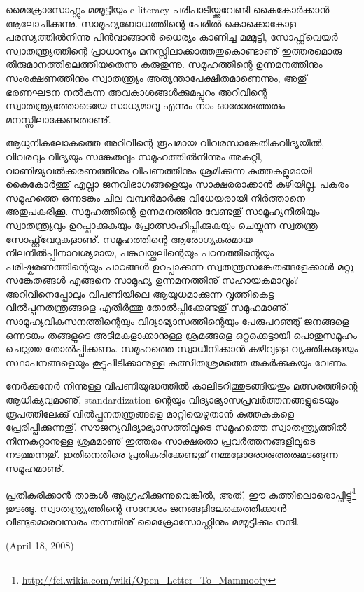 ﻿
\enlargethispage{3\baselineskip}

മൈക്രോസോഫ്റ്റും മമ്മൂട്ടിയും e-literacy പരിപാടിയ്ക്കുവേണ്ടി കൈകോര്‍ക്കാന്‍ ആലോചിക്കുന്നു. 
സാമൂഹ്യബോധത്തിന്റെ പേരില്‍ കൊക്കൊകോള പരസ്യത്തില്‍നിന്നു പിന്‍വാങ്ങാന്‍ ധൈര്യം കാണിച്ച മമ്മൂട്ടി, 
സോഫ്റ്റ്‌വെയര്‍ സ്വാതന്ത്ര്യത്തിന്റെ പ്രാധാന്യം മനസ്സിലാക്കാത്തതുകൊണ്ടാണു് ഇത്തരമൊരു തീരുമാനത്തിലെത്തിയതെന്നു 
കരുതുന്നു. സമൂഹത്തിന്റെ ഉന്നമനത്തിനും സംരക്ഷണത്തിനും സ്വാതന്ത്ര്യം അത്യന്താപേക്ഷിതമാണെന്നും, അതു് ഭരണഘടന 
നല്‍കുന്ന അവകാശങ്ങള്‍ക്കുമപ്പുറം അറിവിന്റെ സ്വാതന്ത്ര്യത്തോടെയേ സാധ്യമാവൂ എന്നും നാം ഓരോരുത്തരും 
മനസ്സിലാക്കേണ്ടതാണു്.

ആധുനികലോകത്തെ അറിവിന്റെ രൂപമായ വിവരസാങ്കേതികവിദ്യയില്‍, വിവരവും വിദ്യയും സങ്കേതവും സമൂഹത്തില്‍നിന്നും അകറ്റി, 
വാണിജ്യവല്‍ക്കരണത്തിനും വിപണത്തിനും ശ്രമിക്കുന്ന കുത്തകളുമായി കൈകോര്‍ത്തു് എല്ലാ ജനവിഭാഗങ്ങളെയും 
സാക്ഷരരാക്കാന്‍ കഴിയില്ല. പകരം സമൂഹത്തെ ഒന്നടങ്കം ചില വമ്പന്‍മാര്‍ക്കു വിധേയരായി നിര്‍ത്താനെ അതുപകരിക്കൂ. 
സമൂഹത്തിന്റെ ഉന്നമനത്തിനു വേണ്ടതു് സാമൂഹ്യനീതിയും സ്വാതന്ത്ര്യവും ഉറപ്പാക്കുകയും പ്രോത്സാഹിപ്പിക്കുകയും 
ചെയ്യുന്ന സ്വതന്ത്ര സോഫ്റ്റ്‌വേറുകളാണു്. സമൂഹത്തിന്റെ ആരോഗ്യകരമായ നിലനില്‍പ്പിനാവശ്യമായ, പങ്കുവയ്ക്കലിന്റെയും 
പഠനത്തിന്റെയും പരിഷ്കരണത്തിന്റെയും പാഠങ്ങള്‍ ഉറപ്പാക്കുന്ന സ്വതന്ത്രസങ്കേതങ്ങളേക്കാള്‍ മറ്റു സങ്കേതങ്ങള്‍ എങ്ങനെ 
സാമൂഹ്യ ഉന്നമനത്തിനു് സഹായകമാവും? അറിവിനെപ്പോലും വിപണിയിലെ ആയുധമാക്കുന്ന വൃത്തികെട്ട വില്‍പ്പനതന്ത്രങ്ങളെ 
എതിര്‍ത്തു തോല്‍പ്പിക്കേണ്ടതു് സമൂഹമാണു്. സാമൂഹ്യവികസനത്തിന്റെയും വിദ്യാഭ്യാസത്തിന്റെയും പേരുപറഞ്ഞു് 
ജനങ്ങളെ ഒന്നടങ്കം തങ്ങളുടെ അടിമകളാക്കാനുള്ള ശ്രമങ്ങളെ ഒറ്റക്കെട്ടായി പൊതുസമൂഹം ചെറുത്തു തോല്‍പ്പിക്കണം. 
സമൂഹത്തെ സ്വാധീനിക്കാന്‍ കഴിവുള്ള വ്യക്തികളേയും സ്ഥാപനങ്ങളെയും കൂട്ടുപിടിക്കാനുള്ള കുത്സിതശ്രമത്തെ 
തകര്‍ക്കുകയും വേണം.

നേര്‍ക്കുനേര്‍ നിന്നുള്ള വിപണിയുദ്ധത്തില്‍ കാലിടറിത്തുടങ്ങിയതും മത്സരത്തിന്റെ ആധിക്യവുമാണു്, standardization ന്റെയും 
വിദ്യാഭ്യാസപ്രവര്‍ത്തനങ്ങളുടെയും രൂപത്തിലേക്കു് വില്‍പ്പനതന്ത്രങ്ങളെ മാറ്റിയെഴുതാന്‍ കുത്തകകളെ പ്രേരിപ്പിക്കുന്നതു്. 
 സൗജന്യവിദ്യാഭ്യാസത്തിലൂടെ സമൂഹത്തെ സ്വാതന്ത്ര്യത്തില്‍ നിന്നകറ്റാനുള്ള ശ്രമമാണു് ഇത്തരം സാക്ഷരതാ 
പ്രവര്‍ത്തനങ്ങളിലൂടെ നടത്തുന്നതു്. ഇതിനെതിരെ പ്രതികരിക്കേണ്ടതു് നമ്മളോരോരുത്തരുമടങ്ങുന്ന സമൂഹമാണു്.

\vskip 2pt

പ്രതികരിക്കാന്‍ താങ്കള്‍ ആഗ്രഹിക്കുന്നുവെങ്കില്‍, അത്, 
ഈ കത്തിലൊരൊപ്പിട്ടു്\footnote{\url{http://fci.wikia.com/wiki/Open_Letter_To_Mammooty}} തുടങ്ങൂ. 
സ്വാതന്ത്ര്യത്തിന്റെ സന്ദേശം ജനങ്ങളിലേക്കെത്തിക്കാന്‍ വീണ്ടുമൊരവസരം തന്നതിനു് മൈക്രോസോഫ്റ്റിനും മമ്മൂട്ടിക്കും നന്ദി.

\begin{flushright}(April 18, 2008)\end{flushright}
\newpage
